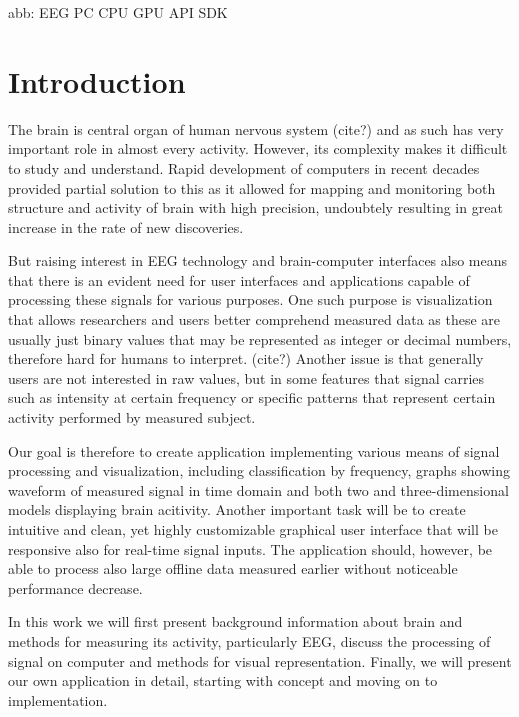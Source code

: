 abb:
EEG
PC
CPU
GPU
API
SDK

\chapter{Introduction}
The brain is central organ of human nervous system (cite?) and as such has very
important role in almost every activity. However, its complexity makes it
difficult to study and understand. Rapid development of computers in recent
decades provided partial solution to this as it allowed for mapping and
monitoring both structure and activity of brain with high precision,
undoubtely resulting in great increase in the rate of new discoveries.

But raising interest in EEG technology and brain-computer interfaces also means
that there is an evident need for user interfaces and applications capable of
processing these signals for various purposes. One such purpose is visualization
that allows researchers and users better comprehend measured data as these are
usually just binary values that may be represented as integer or decimal
numbers, therefore hard for humans to interpret. (cite?) Another issue is that
generally users are not interested in raw values, but in some features that
signal carries such as intensity at certain frequency or specific patterns that
represent certain activity performed by measured subject.

Our goal is therefore to create application implementing various means of signal
processing and visualization, including classification by frequency, graphs
showing waveform of measured signal in time domain and both two and
three-dimensional models displaying brain acitivity. Another important task will
be to create intuitive and clean, yet highly customizable graphical user
interface that will be responsive also for real-time signal inputs. The
application should, however, be able to process also large offline data measured
earlier without noticeable performance decrease.

In this work we will first present background information about brain and
methods for measuring its activity, particularly EEG, discuss the processing of
signal on computer and methods for visual representation. Finally, we will
present our own application in detail, starting with concept and moving on to
implementation.
 
